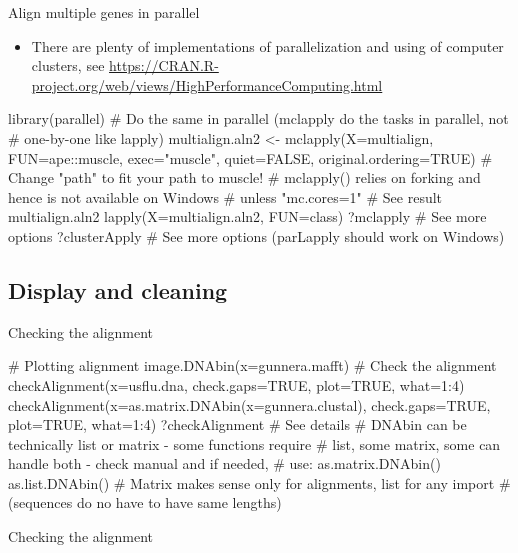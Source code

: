\documentclass[compress, ucs, xelatex, 11pt, xcolor=svgnames, aspectratio=169,
	hyperref={
		bookmarks=true,
		unicode=true,
		colorlinks=true,
		pdftitle={Molecular data in R},
		plainpages=false,
		pdfauthor={Vojtech Zeisek},
		pdfsubject={Course about phylogeny and evolution in R},
		pdfcreator={XeLaTeX},
		pdfkeywords={R, evolution, phylogeny, molecular data},
		linkcolor=Crimson, %
		anchorcolor=Magenta, %
		citecolor=Magenta, %
		filecolor=Magenta, %
		menucolor=Magenta, %
		urlcolor=DodgerBlue, %
		pdftex},
	url={hyphens, lowtilde} %
	]{beamer}
\renewcommand{\texttt}[1]{\colorbox{Beige}{{\ttfamily #1}}}
\begin{document}
\begin{frame}[fragile]{Align multiple genes in parallel}
	\begin{itemize}
		\item There are plenty of implementations of parallelization and using of computer clusters, see \url{https://CRAN.R-project.org/web/views/HighPerformanceComputing.html}
	\end{itemize}
	\begin{spluscode}
    library(parallel)
    # Do the same in parallel (mclapply do the tasks in parallel, not
    # one-by-one like lapply)
    multialign.aln2 <- mclapply(X=multialign, FUN=ape::muscle,
      exec="muscle", quiet=FALSE, original.ordering=TRUE)
    # Change "path" to fit your path to muscle!
    # mclapply() relies on forking and hence is not available on Windows
    # unless "mc.cores=1"
    # See result
    multialign.aln2
    lapply(X=multialign.aln2, FUN=class)
    ?mclapply # See more options
    ?clusterApply # See more options (parLapply should work on Windows)
	\end{spluscode}
\end{frame}

\subsection{Display and cleaning}

\begin{frame}[fragile]{Checking the alignment}
	\begin{spluscode}
    # Plotting alignment
    image.DNAbin(x=gunnera.mafft)
    # Check the alignment
    checkAlignment(x=usflu.dna, check.gaps=TRUE, plot=TRUE, what=1:4)
    checkAlignment(x=as.matrix.DNAbin(x=gunnera.clustal), check.gaps=TRUE,
      plot=TRUE, what=1:4)
    ?checkAlignment # See details
    # DNAbin can be technically list or matrix - some functions require
    # list, some matrix, some can handle both - check manual and if needed,
    # use:
    as.matrix.DNAbin()
    as.list.DNAbin()
    # Matrix makes sense only for alignments, list for any import
    # (sequences do no have to have same lengths)
	\end{spluscode}
\end{frame}

\begin{frame}{Checking the alignment}
	\begin{center}
		\texttt{[image: checkalignment.png]}
	\end{center}
\end{frame}
\end{document}
